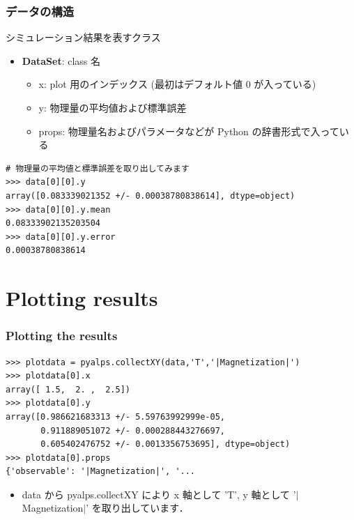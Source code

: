 \begin{frame}[t,fragile]
\frametitle{データの構造}
シミュレーション結果を表すクラス
\begin{itemize}
\item \textbf{DataSet}: class 名
  \begin{itemize}
  \item x: plot 用のインデックス (最初はデフォルト値 0 が入っている)
  \item y: 物理量の平均値および標準誤差
  \item props: 物理量名およびパラメータなどが Python の辞書形式で入っている
  \end{itemize}
\end{itemize}

\begin{lstlisting}
# 物理量の平均値と標準誤差を取り出してみます
>>> data[0][0].y
array([0.083339021352 +/- 0.00038780838614], dtype=object)
>>> data[0][0].y.mean
0.08333902135203504
>>> data[0][0].y.error
0.00038780838614
\end{lstlisting}
\end{frame}

\section{Plotting results}
\begin{frame}[t,fragile]
\frametitle{Plotting the results}
\begin{lstlisting}
>>> plotdata = pyalps.collectXY(data,'T','|Magnetization|')
>>> plotdata[0].x
array([ 1.5,  2. ,  2.5])
>>> plotdata[0].y
array([0.986621683313 +/- 5.59763992999e-05,
       0.911889051072 +/- 0.000288443276697,
       0.605402476752 +/- 0.0013356753695], dtype=object)
>>> plotdata[0].props
{'observable': '|Magnetization|', '...
\end{lstlisting}
\begin{itemize}
\item data から pyalps.collectXY により x 軸として 'T', y 軸として '$|$Magnetization$|$' を取り出しています．
\end{itemize}
\end{frame}

